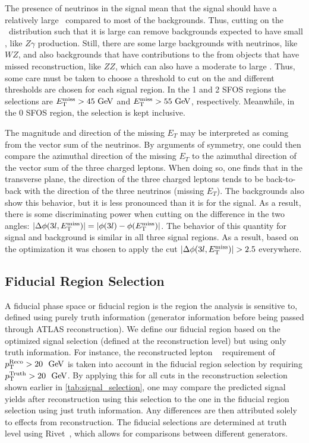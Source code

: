 The presence of neutrinos in the signal mean that the signal should have a 
relatively large \MET~compared to most of the backgrounds. Thus, 
cutting on the \MET~distribution such that it is large can remove backgrounds
expected to have small \MET, like $Z\gamma$ production.
Still, there are some large backgrounds with neutrinos, like $WZ$, 
and also backgrounds that have contributions to the \MET from objects that have
missed reconstruction, like $ZZ$, which can also have a moderate to large \MET.
Thus, some care must be taken to choose a threshold to cut on the \MET and
different thresholds are chosen for each signal 
region.
In the 1 and 2 SFOS regions the selections are $\MET > 45\GeV$
and $\MET > 55\GeV$, respectively. Meanwhile, in the 0 SFOS region, 
the \MET selection is kept inclusive.

The magnitude and direction
of the missing $E_{T}$ may be interpreted as coming from the 
vector sum of the neutrinos.  By arguments of 
symmetry, one could then compare the azimuthal direction 
of the missing $E_{T}$ to the azimuthal direction of the vector
sum of the three charged leptons. When doing so, one finds that 
in the transverse plane, 
the direction of the three charged leptons
tends to be back-to-back with the direction of the 
three neutrinos (missing $E_{T}$). The
backgrounds also show this behavior, but it is less pronounced than 
it is for the signal.  As a result, 
there is some discriminating power when cutting on the difference 
in the two angles: 
$|\Delta\phi(3l,E_{\mathrm{T}}^{\mathrm{miss}})| = |\phi(3l)-\phi(E_{\mathrm{T}}^{\mathrm{miss}})|$. 
The behavior of this quantity for signal and
background is similar in all three signal regions.
As a result, based on the 
optimization it was chosen to apply the cut
$|\Delta\phi(3l,E_{\mathrm{T}}^{\mathrm{miss}})| > 2.5$ everywhere.  



\subsection{Fiducial Region Selection}
\label{sec:fiducial}

A fiducial phase space or fiducial region is the 
region the analysis is sensitive to, defined 
using purely truth information (generator information before
being passed through ATLAS reconstruction).
We define our fiducial region
based on the optimized signal selection (defined at the reconstruction level)
but using only truth information. For instance, the reconstructed
lepton \pt~ requirement of 
$\pt^{\textrm{Reco}} > 20~\GeV$
is taken into account in the fiducial region selection
by requiring 
$\pt^{\textrm{Truth}} > 20~\GeV$.
By applying this for all cuts in the reconstruction selection
shown earlier in \tab\ref{tab:signal_selection},
one may compare the predicted signal yields after reconstruction
using this selection to the one in the fiducial region selection
using just truth information. Any differences are then attributed solely
to effects from reconstruction. 
The fiducial selections are determined at truth level 
using Rivet~\cite{Buckley:2010ar}, which allows for 
comparisons between different generators.


